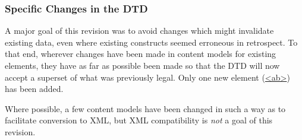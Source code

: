 \subsubsection[{Specific Changes in the DTD}]{Specific Changes in the DTD}\label{ppf-spc}\par
A major goal of this revision was to avoid changes which might invalidate existing data, even where existing constructs seemed erroneous in retrospect. To that end, wherever changes have been made in content models for existing elements, they have as far as possible been made so that the DTD will now accept a superset of what was previously legal. Only one new element (\hyperref[TEI.ab]{<ab>}) has been added.\par
Where possible, a few content models have been changed in such a way as to facilitate conversion to XML, but XML compatibility is \textit{not} a goal of this revision.\par
